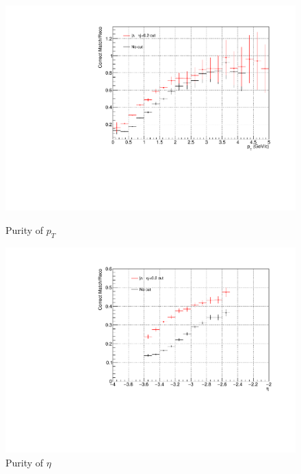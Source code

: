 \begin{figure}[htbp]
                \\
                \vspace{1em}
                \begin{minipage}{0.45\textwidth}
                \centering
                \includegraphics[width=\textwidth]{fig/3_5_6_purity_pt.pdf}
                    \caption{Purity of $p_T$}
                    \label{purity_of_pt}
                \end{minipage}
                \hfill
                \begin{minipage}{0.45\textwidth}
                    \centering
                    \includegraphics[width=\textwidth]{fig/3_5_6_purity_eta.pdf}
                    \caption{Purity of $\eta$} 
                    \label{purity_of_eta}
                \end{minipage}

\end{figure}
